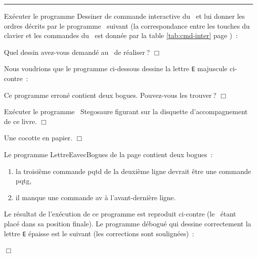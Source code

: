  
\noindent \rule{137mm}{0.1mm} %
\begin{exercice}{
Exécuter le programme {\idt Des\-si\-ner} de commande 
interactive du \robot\ et lui donner les ordres décrits par 
le programme \pascal\ suivant (la correspondance entre les touches du
clavier et les commandes du \robot\ est donnée par la table
\ref{tab:cmd-inter} page \pageref{tab:cmd-inter})~:

\noindent Quel dessin avez-vous demandé au \robot\ de réaliser$\:$?
\noindent $\Box$}\end{exercice}
\begin{exercice}{
Nous voudrions que le programme ci-dessous dessine la lettre {\tt E} majuscule 
\hbox{ci-contre~:}

{\raggedright 
\vspace{\baselineskip}
\vspace*{3cm}%
\vspace*{-3cm}%
 \label{prog:LettreEavecBogues}
 
 }
\noindent Ce programme erroné contient deux bogues. Pouvez-vous les trouver$\:$?
\noindent $\Box$}\end{exercice}
\begin{exercice}{
Exécuter le programme \pascal\ {\idt Stegosaure} figurant sur la disquette
d'accompagnement de ce livre.
\noindent $\Box$}\end{exercice}
\begin{corrige}{
Une cocotte en papier.
\noindent $\Box$}\end{corrige}
\begin{corrige}{
Le programme {\idt LettreEavecBogues} de la page \pageref{prog:LettreEavecBogues} 
contient deux bogues~:\\
\begin{minipage}[t]{115mm}
\begin{enumerate}
\item la troi\-si\-ème commande {\idt pqtd} de la deuxième ligne
devrait être une commande {\idt pqtg},
\item il manque une commande {\idt av} à l'avant-dernière ligne. 
\end{enumerate}
Le résultat de l'exécution de ce programme est reproduit ci-contre
(le \robot\ étant placé dans sa position finale).
Le programme débogué qui dessine correctement la lettre {\tt E} épaisse est le suivant (les corrections sont 
sou\-li\-gnées)~:
\end{minipage}
\hfill
\begin{minipage}[t]{17mm}
\vspace{3.2cm}%
\hspace{-1.7cm}  %
\end{minipage}

\noindent $\Box$}\end{corrige}
